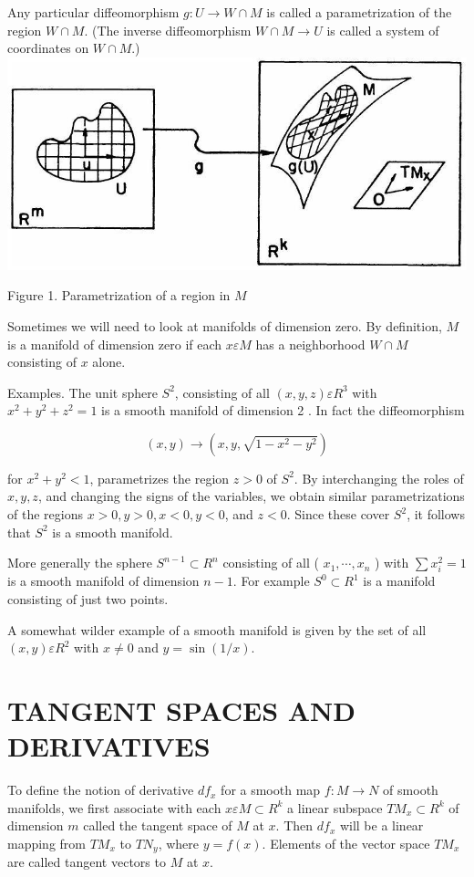 \documentclass[10pt, letterpaper]{article}
\begin{document}
Any particular diffeomorphism $g: U \rightarrow W \cap M$ is called a parametrization of the region $W \cap M$. (The inverse diffeomorphism $W \cap M \rightarrow U$ is called a system of coordinates on $W \cap M$.)\\
\includegraphics[scale=0.2, center]{2025_05_28_7c9927389b272ddbc2c3g-13}

Figure 1. Parametrization of a region in $M$

Sometimes we will need to look at manifolds of dimension zero. By definition, $M$ is a manifold of dimension zero if each $x \varepsilon M$ has a neighborhood $W \cap M$ consisting of $x$ alone.

Examples. The unit sphere $S^{2}$, consisting of all $(x, y, z) \varepsilon R^{3}$ with $x^{2}+y^{2}+z^{2}=1$ is a smooth manifold of dimension 2 . In fact the diffeomorphism

$$
(x, y) \rightarrow\left(x, y, \sqrt{1-x^{2}-y^{2}}\right)
$$

for $x^{2}+y^{2}<1$, parametrizes the region $z>0$ of $S^{2}$. By interchanging the roles of $x, y, z$, and changing the signs of the variables, we obtain similar parametrizations of the regions $x>0, y>0, x<0, y<0$, and $z<0$. Since these cover $S^{2}$, it follows that $S^{2}$ is a smooth manifold.

More generally the sphere $S^{n-1} \subset R^{n}$ consisting of all ( $x_{1}, \cdots, x_{n}$ ) with $\sum x_{i}^{2}=1$ is a smooth manifold of dimension $n-1$. For example $S^{0} \subset R^{1}$ is a manifold consisting of just two points.

A somewhat wilder example of a smooth manifold is given by the set of all $(x, y) \varepsilon R^{2}$ with $x \neq 0$ and $y=\sin (1 / x)$.

\section*{TANGENT SPACES AND DERIVATIVES}
To define the notion of derivative $d f_{x}$ for a smooth map $f: M \rightarrow N$ of smooth manifolds, we first associate with each $x \varepsilon M \subset R^{k}$ a linear subspace $T M_{x} \subset R^{k}$ of dimension $m$ called the tangent space of $M$ at $x$. Then $d f_{x}$ will be a linear mapping from $T M_{x}$ to $T N_{y}$, where $y=f(x)$. Elements of the vector space $T M_{x}$ are called tangent vectors to $M$ at $x$.
\end{document}
